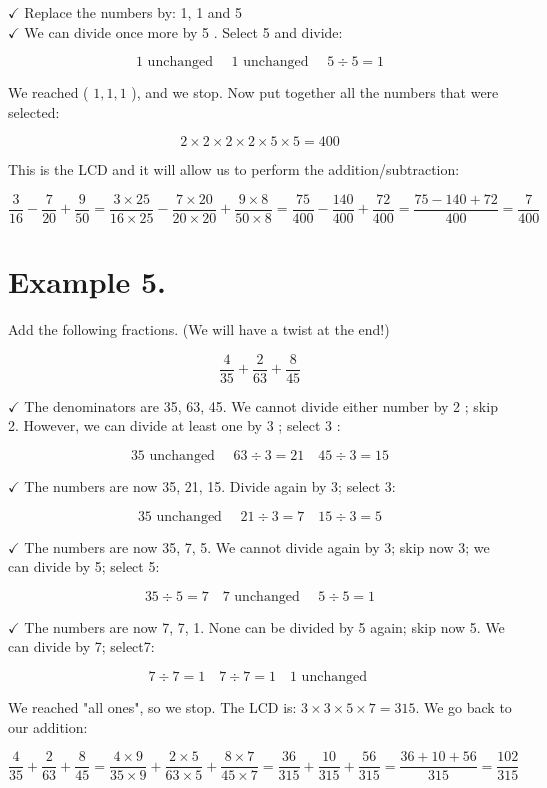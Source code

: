 \documentclass{ximera}
\begin{document}
$\checkmark$ Replace the numbers by: 1, 1 and 5\\
$\checkmark$ We can divide once more by 5 . Select 5 and divide:

$$1 \text { unchanged } \quad 1 \text { unchanged } \quad 5 \div 5=1$$

We reached ( $1,1,1$ ), and we stop. Now put together all the numbers that were selected:

$$2 \times 2 \times 2 \times 2 \times 5 \times 5=400$$

This is the LCD and it will allow us to perform the addition/subtraction:

$$\frac{3}{16}-\frac{7}{20}+\frac{9}{50}=\frac{3 \times 25}{16 \times 25}-\frac{7 \times 20}{20 \times 20}+\frac{9 \times 8}{50 \times 8}=\frac{75}{400}-\frac{140}{400}+\frac{72}{400}=\frac{75-140+72}{400}=\frac{7}{400}$$

\section*{Example 5.}
Add the following fractions. (We will have a twist at the end!)

$$\frac{4}{35}+\frac{2}{63}+\frac{8}{45}$$

$\checkmark$ The denominators are 35, 63, 45. We cannot divide either number by 2 ; skip 2. However, we can divide at least one by 3 ; select 3 :

$$35 \text { unchanged } \quad 63 \div 3=21 \quad 45 \div 3=15$$

$\checkmark$ The numbers are now 35, 21, 15. Divide again by 3; select 3:

$$35 \text { unchanged } \quad 21 \div 3=7 \quad 15 \div 3=5$$

$\checkmark$ The numbers are now 35, 7, 5. We cannot divide again by 3; skip now 3; we can divide by 5; select 5:

$$35 \div 5=7 \quad 7 \text { unchanged } \quad 5 \div 5=1$$

$\checkmark$ The numbers are now 7, 7, 1. None can be divided by 5 again; skip now 5. We can divide by 7; select7:

$$7 \div 7=1 \quad 7 \div 7=1 \quad 1 \text { unchanged }$$

We reached "all ones", so we stop. The LCD is: $3 \times 3 \times 5 \times 7=315$. We go back to our addition:

$$\frac{4}{35}+\frac{2}{63}+\frac{8}{45}=\frac{4 \times 9}{35 \times 9}+\frac{2 \times 5}{63 \times 5}+\frac{8 \times 7}{45 \times 7}=\frac{36}{315}+\frac{10}{315}+\frac{56}{315}=\frac{36+10+56}{315}=\frac{102}{315}$$
\end{document}
